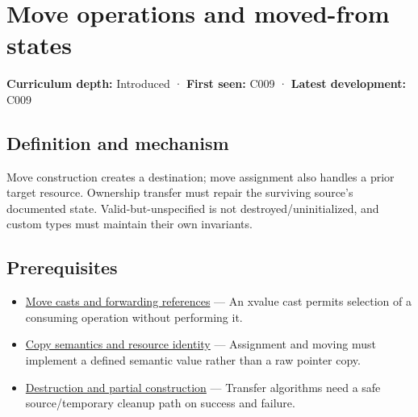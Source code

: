 \hypertarget{appendix-5636651017c2}{}\label{referencestart:appendix-5636651017c2}
\section{Move operations and moved-from states}\label{appendix-5636651017c2-move-operations-and-moved-from-states}

\hypertarget{appendix-5636651017c2-move-operations-and-moved-from-states}{}

\textbf{Curriculum depth:} Introduced · \textbf{First seen:} C009 · \textbf{Latest development:} C009

\begin{allmightroledefinition}

\subsection{Definition and mechanism}\label{appendix-5636651017c2-definition-and-mechanism}

\hypertarget{appendix-5636651017c2-definition-and-mechanism}{}

Move construction creates a destination; move assignment also handles a prior target resource. Ownership transfer must repair the surviving source's documented state. Valid-but-unspecified is not destroyed/uninitialized, and custom types must maintain their own invariants.

\end{allmightroledefinition}

\subsection{Prerequisites}\label{appendix-5636651017c2-prerequisites}

\hypertarget{appendix-5636651017c2-prerequisites}{}

\begin{itemize}
\tightlist
\item
  \hyperref[appendix-0104b704fb11]{Move casts and forwarding references} --- An xvalue cast permits selection of a consuming operation without performing it.
\item
  \hyperref[appendix-1340cd1ce582]{Copy semantics and resource identity} --- Assignment and moving must implement a defined semantic value rather than a raw pointer copy.
\item
  \hyperref[appendix-9bfe377cef7a]{Destruction and partial construction} --- Transfer algorithms need a safe source/temporary cleanup path on success and failure.
\end{itemize}

